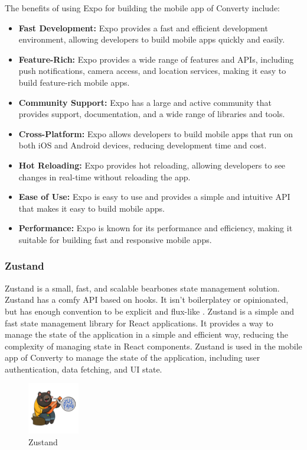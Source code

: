 The benefits of using Expo for building the mobile app of Converty include:

\begin{itemize}
    \item \textbf{Fast Development:} Expo provides a fast and efficient development environment, allowing developers to build mobile apps quickly and easily.
    \item \textbf{Feature-Rich:} Expo provides a wide range of features and APIs, including push notifications, camera access, and location services, making it easy to build feature-rich mobile apps.
    \item \textbf{Community Support:} Expo has a large and active community that provides support, documentation, and a wide range of libraries and tools.
    \item \textbf{Cross-Platform:} Expo allows developers to build mobile apps that run on both iOS and Android devices, reducing development time and cost.
    \item \textbf{Hot Reloading:} Expo provides hot reloading, allowing developers to see changes in real-time without reloading the app.
    \item \textbf{Ease of Use:} Expo is easy to use and provides a simple and intuitive API that makes it easy to build mobile apps.
    \item \textbf{Performance:} Expo is known for its performance and efficiency, making it suitable for building fast and responsive mobile apps.
\end{itemize}

\subsubsection{Zustand}
Zustand is a small, fast, and scalable bearbones state management solution. Zustand has a comfy API based on hooks. It isn't boilerplatey or opinionated, but has enough convention to be explicit and flux-like \cite{zustand}. Zustand is a simple and fast state management library for React applications. It provides a way to manage the state of the application in a simple and efficient way, reducing the complexity of managing state in React components. Zustand is used in the mobile app of Converty to manage the state of the application, including user authentication, data fetching, and UI state.

\begin{figure}[H]
    \centering
    \includegraphics[width=0.2\textwidth]{Images/zustand.png}
    \caption{Zustand}
    \label{fig:zustand}
\end{figure}

